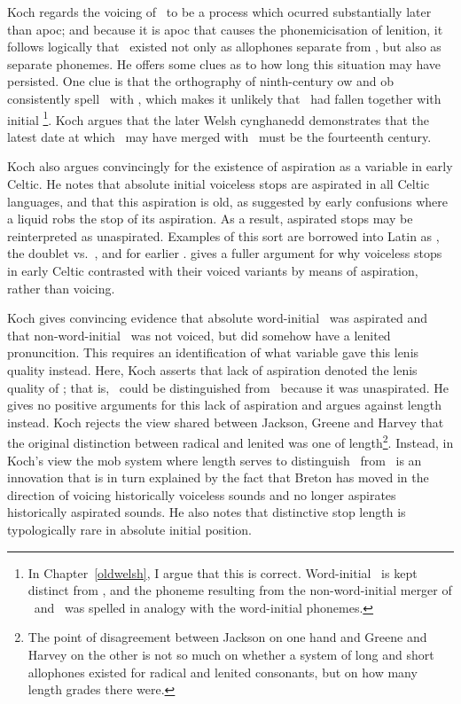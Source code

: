 Koch regards the voicing of \lT\ to be a process which ocurred substantially later than \gls{apoc}; and because it is \gls{apoc} that causes the phonemicisation of lenition, it follows logically that \lT\ existed not only as allophones separate from \xD, but also as separate \gls{phoneme}s. He offers some clues as to how long this situation may have persisted. One clue is that the orthography of ninth-century \gls{ow} and \gls{ob} consistently spell \lT\ with , which makes it unlikely that \lT\ had fallen together with initial \xD\footnote{In Chapter~\ref{oldwelsh}, I argue that this is correct. Word-initial \lT\ is kept distinct from \xD, and the phoneme resulting from the non-word-initial merger of \lT\ and \xD\ was spelled in analogy with the word-initial phonemes.}. Koch argues that the later Welsh cynghanedd demonstrates that the latest date at which \lT\ may have merged with \xD\ must be the fourteenth century. 

Koch also argues convincingly for the existence of aspiration as a variable in early Celtic. He notes that absolute initial voiceless stops are aspirated in all Celtic languages, and that this aspiration is old, as suggested by early confusions where a liquid robs the stop of its aspiration. As a result, aspirated stops may be reinterpreted as unaspirated. Examples of this sort are   borrowed into Latin as , the doublet  vs.~, and  for earlier . \Textcite{Esk_LaryngealRealism18} gives a fuller argument for why voiceless stops in early Celtic contrasted with their voiced variants by means of aspiration, rather than voicing.

Koch gives convincing evidence that absolute word-initial \xT\ was aspirated and that non-word-initial \lT\ was not voiced, but did somehow have a lenited pronuncition. This requires an identification of what variable gave  this lenis quality instead. Here, Koch asserts that lack of aspiration denoted the lenis quality of \lT; that is, \lT\ could be distinguished from \xT\ because it was unaspirated. He gives no positive arguments for this lack of aspiration and argues against length instead. Koch rejects the view shared between Jackson, Greene and Harvey that the original distinction between radical and lenited was one of length\footnote{The point of disagreement between Jackson on one hand and Greene and Harvey on the other is not so much on whether a system of long and short allophones existed for radical and lenited consonants, but on how many length grades there were.}. Instead, in Koch's view the \gls{mob} system where length serves to distinguish \lT\ from \xD\ is an innovation that is in turn  explained by the fact that Breton has moved in the direction of voicing historically voiceless sounds and no longer aspirates historically aspirated sounds. He also notes that distinctive stop length is typologically rare in absolute initial position. 

